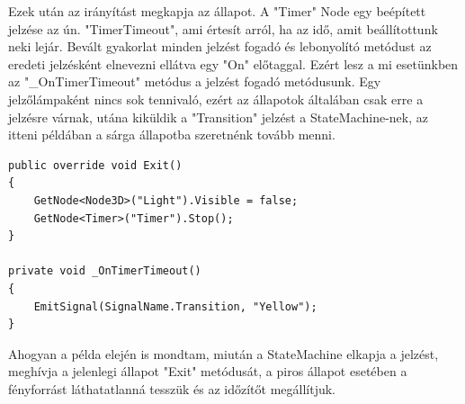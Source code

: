 Ezek után az irányítást megkapja az állapot. A "Timer" Node egy beépített jelzése az ún. "TimerTimeout", ami értesít arról, ha az idő, amit beállítottunk neki lejár. Bevált gyakorlat minden jelzést fogadó és lebonyolító metódust az eredeti jelzésként elnevezni ellátva egy "On" előtaggal. Ezért lesz a mi esetünkben az "\_OnTimerTimeout" metódus a jelzést fogadó metódusunk. 
Egy jelzőlámpaként nincs sok tennivaló, ezért az állapotok általában csak erre a jelzésre várnak, utána kiküldik a "Transition" jelzést a StateMachine-nek, az itteni példában a sárga állapotba szeretnénk tovább menni.

\lstset{style=sharpc}
\begin{lstlisting}
public override void Exit()
{
	GetNode<Node3D>("Light").Visible = false;
	GetNode<Timer>("Timer").Stop();
}
	
private void _OnTimerTimeout()
{
	EmitSignal(SignalName.Transition, "Yellow");
}

\end{lstlisting}

Ahogyan a példa elején is mondtam, miután a StateMachine elkapja a jelzést, meghívja a jelenlegi állapot "Exit" metódusát, a piros állapot esetében a fényforrást láthatatlanná tesszük és az időzítőt megállítjuk.